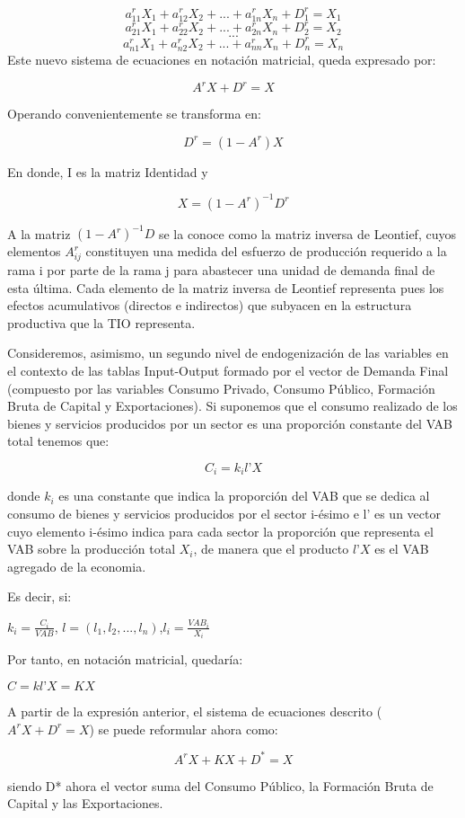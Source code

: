 \documentclass{article}
\begin{document}
$$a^r_{11}X_1+a^r_{12}X_2+...+a^r_{1n}X_n+D^r_1=X_1$$
$$a^r_{21}X_1+a^r_{22}X_2+...+a^r_{2n}X_n+D^r_2=X_2$$
$$...$$
$$a^r_{n1}X_1+a^r_{n2}X_2+...+a^r_{nn}X_n+D^r_n=X_n$$
Este nuevo sistema de ecuaciones en notación matricial, queda expresado por:

$$A^rX+D^r=X$$

Operando convenientemente se transforma en:

$$D^r=(1-A^r)X$$

En donde, I es la matriz Identidad y

$$X=(1-A^r)^{-1}D^r$$

A la matriz $(1-A^r)^{-1}D$ se la conoce como la matriz inversa de Leontief, cuyos elementos $A^r_{ij}$ constituyen una medida del esfuerzo de producción requerido a la rama i por parte de la rama j para abastecer una unidad de demanda final de esta última. Cada elemento de la matriz inversa de Leontief representa pues los efectos acumulativos (directos e indirectos) que subyacen en la estructura productiva que la TIO representa.

Consideremos, asimismo, un segundo nivel de endogenización de las variables en el contexto de las tablas Input-Output formado por el vector de Demanda Final (compuesto por las variables Consumo Privado, Consumo Público, Formación Bruta de Capital y Exportaciones). Si suponemos que el consumo realizado de los bienes y servicios producidos por un sector es una proporción constante del VAB total tenemos que:

$$C_i = k_i l’X$$

donde $k_i$  es una constante que indica la proporción del VAB que se dedica al consumo de bienes y servicios producidos por el sector i-ésimo e l’ es un vector cuyo elemento i-ésimo indica para cada sector la proporción que representa el VAB sobre la producción total $X_i$, de manera que el producto $l’X$ es el VAB agregado de la economia.

Es decir, si:

$k_i=\frac{C_i}{VAB}$, $l=(l_1,l_2,...,l_n)$,$l_i=\frac{VAB_i}{X_i}$

Por tanto, en notación matricial, quedaría:

$C = kl’X = KX$

A partir de la expresión anterior, el sistema de ecuaciones descrito ($A^rX+D^r=X$) se puede reformular ahora como:

$$A^rX+KX+D^*= X$$

siendo D* ahora el vector suma del Consumo Público, la Formación Bruta de Capital y las Exportaciones.
\end{document}
